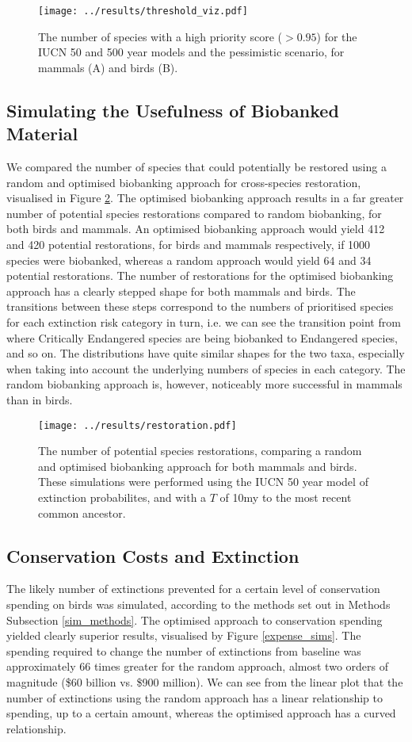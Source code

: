 \documentclass[10pt]{article}
\begin{document}
	\begin{figure}
		\texttt{[image: ../results/threshold\_viz.pdf]}
		\caption{The number of species with a high priority score ($> 0.95$)
			for the IUCN 50 and 500 year models and the pessimistic scenario, for 
			mammals (A) and birds (B).}\label{thresh_viz}
	\end{figure}
	
	\subsection{Simulating the Usefulness of Biobanked Material}
	We compared the number of species that could potentially be restored using
	a random and optimised biobanking approach for cross-species restoration,
	visualised in Figure \ref{rest_sims}. The optimised biobanking approach
	results in a far greater number of potential species restorations
	compared to random biobanking, for both birds and mammals. An optimised
	biobanking approach would yield 412 and 420 potential restorations, for
	birds and mammals respectively, if 1000 species were biobanked, whereas
	a random approach would yield 64 and 34 potential restorations. The number
	of restorations for the optimised biobanking approach has a clearly stepped
	shape for both mammals and birds. The transitions between these steps
	correspond to the numbers of prioritised species for each extinction risk
	category in turn, i.e. we can see the transition point from where Critically
	Endangered species are being biobanked to Endangered species, and so on.
	The distributions have quite similar shapes for the two taxa, especially
	when taking into account the underlying numbers of species in each category.
	The random biobanking approach is, however, noticeably more successful in mammals
	than in birds.
	
	\begin{figure}
		\texttt{[image: ../results/restoration.pdf]}
		\caption{The number of potential species restorations, comparing
		a random and optimised biobanking approach for both mammals and birds.
		These simulations were performed using the IUCN 50 year model of
		extinction probabilites, and with a $T$ of 10my to the most recent
		common ancestor.}\label{rest_sims}
	\end{figure}

	
	\subsection{Conservation Costs and Extinction}
	The likely number of extinctions prevented for a certain level of
	conservation spending on birds was simulated, according to the
	methods set out in Methods Subsection \ref{sim_methods}. The optimised
	approach to conservation spending yielded clearly superior results,
	visualised by Figure \ref{expense_sims}. The spending required to
	change the number of extinctions from baseline was approximately
	66 times greater for the random approach, almost two orders of
	magnitude (\$60 billion vs. \$900 million). We can see from the
	linear plot that the number of extinctions using the random approach
	has a linear relationship to spending, up to a certain amount, whereas
	the optimised approach has a curved relationship.
	
\end{document}
